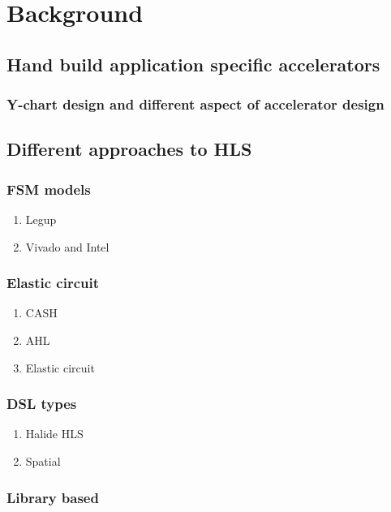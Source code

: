 
\chapter{Background}
\label{background}



\section{Hand build application specific accelerators}
\subsection{Y-chart design and different aspect of accelerator design}

\section{Different approaches to HLS}
\subsection{FSM models}
\begin{enumerate}
    \item Legup
    \item Vivado and Intel
\end{enumerate}

\subsection{Elastic circuit}

\begin{enumerate}
    \item CASH
    \item AHL
    \item Elastic circuit
\end{enumerate}

\subsection{DSL types}
\begin{enumerate}
    \item Halide HLS
    \item Spatial
\end{enumerate}

\subsection{Library based}


